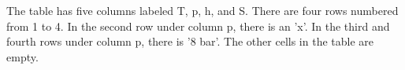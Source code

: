 The table has five columns labeled T, p, h, and S. There are four rows numbered from 1 to 4. In the second row under column p, there is an 'x'. In the third and fourth rows under column p, there is '8 bar'. The other cells in the table are empty.